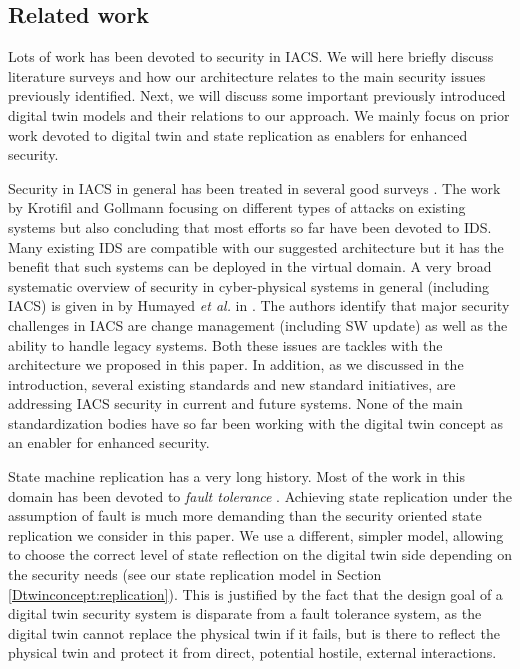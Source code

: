 \subsection{Related work}
\label{sec:digital-twin:relatedwork}
Lots of work has been devoted to security in IACS. We will here briefly discuss literature surveys and how our architecture relates to the main security issues previously identified. Next, we will discuss some important previously introduced digital twin models and their relations to our approach. We mainly focus on prior work devoted to digital twin and state replication as enablers for enhanced security. 

Security in IACS in general has been treated in several good surveys \cite{krotofilgollman2013, uchenaEtAl2017}. The work by Krotifil and Gollmann \cite{krotofilgollman2013} focusing on different types of attacks on existing systems but also concluding that most efforts so far have been devoted to IDS. Many existing IDS are compatible with our suggested architecture but it has the benefit that such systems can be deployed in the virtual domain. A very broad systematic overview of security in cyber-physical systems in general (including IACS) is given in by Humayed \emph{et al.} in \cite{HumayedEtAl2017}. The authors identify that major security challenges in IACS are change management (including SW update) as well as the ability to handle legacy systems. Both these issues are tackles with the architecture we proposed in this paper. In addition, as we discussed in the introduction, several existing standards and new standard initiatives, are addressing IACS security in current and future systems. None of the main standardization bodies have so far been working with the digital twin concept as an enabler for enhanced security.

State machine replication has a very long history. Most of the work in this domain has been devoted to \textit{fault tolerance} \cite{Lamport:1978, Schneider1990}. Achieving state replication under the assumption of fault is much more demanding than the security oriented state replication we consider in this paper. We use a different, simpler model, allowing to choose the correct level of state reflection on the digital twin side depending on the security needs (see our state replication model in Section \ref{Dtwinconcept:replication}).  This is justified by the fact that the design goal of a digital twin security system is disparate from a fault tolerance system, as the digital twin cannot replace the physical twin if it fails, but is there to reflect the physical twin and protect it from direct, potential hostile, external interactions.

